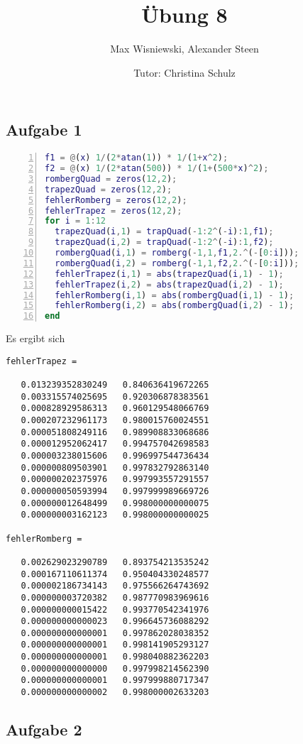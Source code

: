 \documentclass[11pt,a4paper,ngerman]{article}
\date{Tutor: Christina Schulz}
\title{Übung 8}
\author{Max Wisniewski, Alexander Steen}
\begin{document}

\renewcommand{\figurename}{Figure}

\maketitle
\thispagestyle{fancy}

\subsection*{Aufgabe 1}

\begin{lstlisting}[language=matlab,numbers=left]
f1 = @(x) 1/(2*atan(1)) * 1/(1+x^2);
f2 = @(x) 1/(2*atan(500)) * 1/(1+(500*x)^2);
rombergQuad = zeros(12,2);
trapezQuad = zeros(12,2);
fehlerRomberg = zeros(12,2);
fehlerTrapez = zeros(12,2);
for i = 1:12
  trapezQuad(i,1) = trapQuad(-1:2^(-i):1,f1);
  trapezQuad(i,2) = trapQuad(-1:2^(-i):1,f2);
  rombergQuad(i,1) = romberg(-1,1,f1,2.^(-[0:i]));
  rombergQuad(i,2) = romberg(-1,1,f2,2.^(-[0:i]));
  fehlerTrapez(i,1) = abs(trapezQuad(i,1) - 1);
  fehlerTrapez(i,2) = abs(trapezQuad(i,2) - 1);
  fehlerRomberg(i,1) = abs(rombergQuad(i,1) - 1);
  fehlerRomberg(i,2) = abs(rombergQuad(i,2) - 1);
end
\end{lstlisting}

Es ergibt sich

\begin{lstlisting}
fehlerTrapez =

   0.013239352830249   0.840636419672265
   0.003315574025695   0.920306878383561
   0.000828929586313   0.960129548066769
   0.000207232961173   0.980015760024551
   0.000051808249116   0.989908833068686
   0.000012952062417   0.994757042698583
   0.000003238015606   0.996997544736434
   0.000000809503901   0.997832792863140
   0.000000202375976   0.997993557291557
   0.000000050593994   0.997999989669726
   0.000000012648499   0.998000000000075
   0.000000003162123   0.998000000000025

fehlerRomberg =

   0.002629023290789   0.893754213535242
   0.000167110611374   0.950404330248577
   0.000002186734143   0.975566264743692
   0.000000003720382   0.987770983969616
   0.000000000015422   0.993770542341976
   0.000000000000023   0.996645736088292
   0.000000000000001   0.997862028038352
   0.000000000000001   0.998141905293127
   0.000000000000001   0.998040882362203
   0.000000000000000   0.997998214562390
   0.000000000000001   0.997999880717347
   0.000000000000002   0.998000002633203

\end{lstlisting}

\subsection*{Aufgabe 2}


\label{LastPage}
\end{document}
